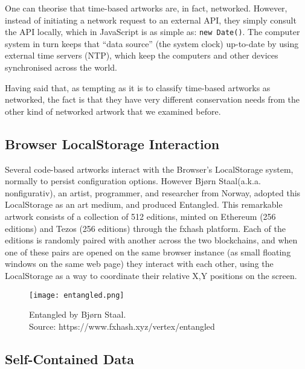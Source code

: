 
One can theorise that time-based artworks are, in fact, networked. However, instead of initiating a network request to an external API, they simply consult the API locally, which in JavaScript is as simple as: \texttt{new Date()}. The computer system in turn keeps that ``data source'' (the system clock) up-to-date by using external time servers (NTP), which keep the computers and other devices synchronised across the world.

Having said that, as tempting as it is to classify time-based artworks as networked, the fact is that they have very different conservation needs from the other kind of networked artwork that we examined before.


\subsection{Browser LocalStorage Interaction}

Several code-based artworks interact with the Browser's LocalStorage system, normally to persist configuration options. However Bjørn Staal\footnotemark[10] (a.k.a. nonfigurativ), an artist, programmer, and researcher from Norway, adopted this LocalStorage as an art medium, and produced Entangled. This remarkable artwork consists of a collection of 512 editions, minted on Ethereum (256 editions) and Tezos (256 editions) through the fxhash platform. Each of the editions is randomly paired with another across the two blockchains, and when one of these pairs are opened on the same browser instance (as small floating windows on the same web page) they interact with each other, using the LocalStorage as a way to coordinate their relative X,Y positions on the screen.


\begin{figure}[h]
    \centering
    \captionsetup{justification=centering}
    \texttt{[image: entangled.png]}
    \captionsetup{justification=centering}
    \caption[Entangled by Bjørn Staal]{Entangled by Bjørn Staal. \\ Source: https://www.fxhash.xyz/vertex/entangled}
    \label{fig:detachment}
\end{figure}


\subsection{Self-Contained Data}

